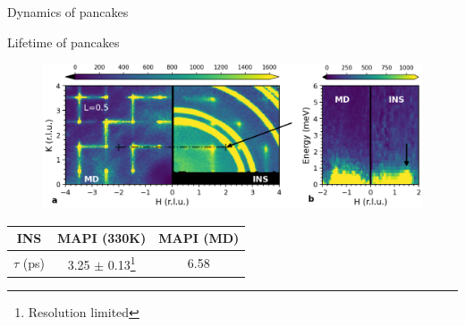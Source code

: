 \documentclass[12pt]{beamer}
\begin{document}
\begin{frame}{Dynamics of pancakes}
\centering
{}
\end{frame}


\begin{frame}{Lifetime of pancakes}

\begin{figure}
    \includegraphics[width=1.0\linewidth]{figs/lifetimes.png}
\end{figure}

\begin{center}
\begin{tabular}{||c | c c ||}
\hline
    INS & MAPI (330K) & MAPI (MD) \\ [0.5ex]
    \hline\hline
    $\tau$ (ps) & 3.25 $\pm$ 0.13\footnote{Resolution limited} & 6.58 \\ [1ex]
    \hline\hline
\end{tabular}
\end{center}


\end{frame}

\end{document}
